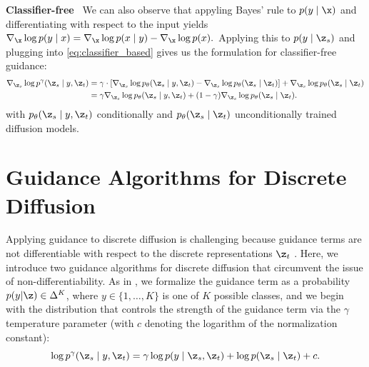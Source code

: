 \documentclass{article} %
\begin{document}
\textbf{Classifier-free}~
We can also observe that appyling Bayes' rule to $p(y \mid \x)$ and differentiating with respect to the input yields $\nabla_\x \log p(y \mid x) = \nabla_\x \log p(x \mid y) - \nabla_\x \log p(x).$
Applying this to $p(y \mid \z_s)$ and plugging into \eqref{eq:classifier_based} gives us the formulation for classifier-free guidance:
\begin{align}
    \nabla_{\z_s} \log p^{\gamma}(\z_s \mid y, \z_t) &= \gamma\cdot[\nabla_{\z_s}\log p_\theta(\z_s \mid y, \z_t) - \nabla_{\z_s} \log p_\theta(\z_s \mid \z_t)] + \nabla_{\z_s} \log p_\theta(\z_s \mid \z_t) \nonumber \\
    &= \gamma\nabla_{\z_s}\log p_\theta(\z_s \mid y, \z_t) + (1-\gamma) \nabla_{\z_s} \log p_\theta(\z_s \mid \z_t). \label{eq:classifier_free}
\end{align}
with $p_\theta(\z_s \mid y, \z_t)$ conditionally and $p_\theta(\z_s \mid \z_t)$ unconditionally trained diffusion models.

\section{Guidance Algorithms for Discrete Diffusion}\label{sec:guidance}
Applying guidance to discrete diffusion is challenging because guidance terms are not differentiable with respect to the discrete representations $\z_t$ \citep{gruver2024protein}.
Here, we introduce two guidance algorithms for discrete diffusion that circumvent the issue of non-differentiability.
As in , we formalize the guidance term as a probability $p(y | \z) \in \Delta^K$, where $y \in \{1, \ldots, K\}$ is one of $K$ possible classes, and we begin with the distribution that controls the strength of the guidance term via the $\gamma$ temperature parameter (with $c$ denoting the logarithm of the normalization constant):
\begin{equation}\label{eq:guidance_unormalized}
    \log p^\gamma(\z_s \mid y, \z_t) = \gamma\log p(y\mid\z_s, \z_t) + \log p(\z_s \mid \z_t) + c.
\end{equation}
\end{document}
